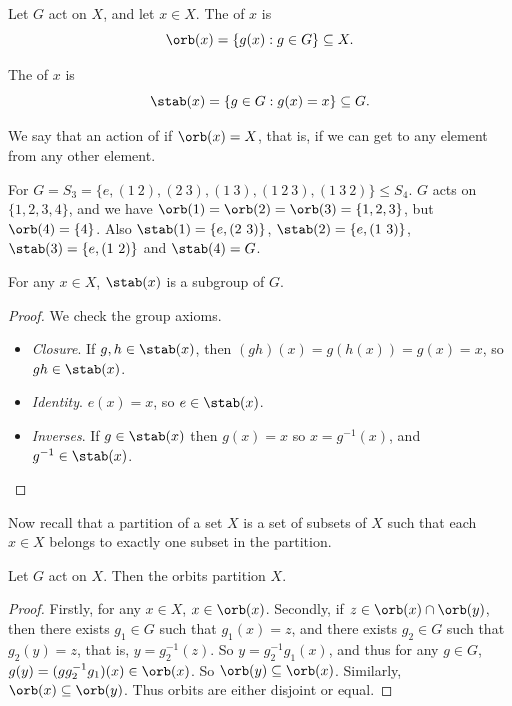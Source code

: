 \documentclass[a4]{scrreprt}
\begin{document}
\begin{definition}[Orbit]
Let $G$ act on $X$, and let $x \in X$. The  of $x$ is
$$
	\orb(x) = \{ g(x) : g \in G \} \subseteq X.
$$
\end{definition}

\begin{definition}[Stabilizer]
The  of $x$ is
$$
\stab(x) = \{ g \in G : g(x) = x \} \subseteq G.
$$
\end{definition}

We say that an action of  if $\orb(x) = X$, that is, if we can get to any element from any other element.

\begin{example}
	For $G = S_3 = \{e, (1\ 2), (2\ 3), (1\ 3), (1\ 2\ 3), (1\ 3\ 2)\} \leq S_4$. $G$ acts on $\{1, 2, 3, 4\}$, and we have $\orb(1) = \orb(2) = \orb(3) =\{1, 2, 3\}$, but $\orb(4) = \{4\}$. Also $\stab(1) = \{e, (2\ 3)\}$, $\stab(2) = \{ e, (1\ 3)\}$, $\stab(3) = \{ e, (1\ 2)\}$ and $\stab(4) = G$.
\end{example}

\begin{lemma}
	For any $x \in X$, $\stab(x)$ is a subgroup of $G$.
\end{lemma}
\begin{proof}
	We check the group axioms.
	\begin{itemize}
		\item \emph{Closure}. If $g, h \in \stab(x)$, then $(gh)(x) = g(h(x)) = g(x) = x$, so $gh \in \stab(x)$.
		\item \emph{Identity}. $e(x) = x$, so $e \in \stab(x)$.
		\item \emph{Inverses}. If $g \in \stab(x)$ then $g(x) = x$ so $x = g^{-1}(x)$, and $g^{-1} \in \stab(x)$.
	\end{itemize}
\end{proof}

Now recall that a partition of a set $X$ is a set of subsets of $X$ such that each $x \in X$ belongs to exactly one subset in the partition.

\begin{lemma}
	Let $G$ act on $X$. Then the orbits partition $X$.
\end{lemma}
\begin{proof}
	Firstly, for any $x \in X$, $x \in \orb(x)$. Secondly, if $z \in \orb(x) \cap \orb(y)$, then there exists $g_1 \in G$ such that $g_1(x) = z$, and there exists $g_2 \in G$ such that $g_2 (y) = z$, that is, $y = g_2^{-1}(z)$. So $y = g_2^{-1} g_1 (x)$, and thus for any $g \in G$, $g(y) = (g g_2^{-1} g_1)(x) \in \orb(x)$. So $\orb(y) \subseteq \orb(x)$. Similarly, $\orb(x) \subseteq \orb(y)$. Thus orbits are either disjoint or equal.
\end{proof}
\end{document}
